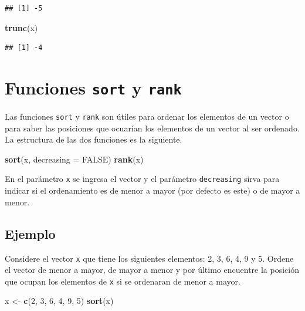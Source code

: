 \documentclass[10pt,]{krantz}
\makeatletter
\newenvironment{Shaded}{\begin{snugshade}}{\end{snugshade}}
\newcommand{\KeywordTok}[1]{\textcolor[rgb]{0.13,0.29,0.53}{\textbf{{#1}}}}
\newcommand{\DataTypeTok}[1]{\textcolor[rgb]{0.13,0.29,0.53}{{#1}}}
\newcommand{\DecValTok}[1]{\textcolor[rgb]{0.00,0.00,0.81}{{#1}}}
\newcommand{\StringTok}[1]{\textcolor[rgb]{0.31,0.60,0.02}{{#1}}}
\newcommand{\OtherTok}[1]{\textcolor[rgb]{0.56,0.35,0.01}{{#1}}}
\newcommand{\NormalTok}[1]{{#1}}
\newenvironment{kframe}{%
\medskip{}
\setlength{\fboxsep}{.8em}
 \def\at@end@of@kframe{}%
 \ifinner\ifhmode%
  \def\at@end@of@kframe{\end{minipage}}%
  \begin{minipage}{\columnwidth}%
 \fi\fi%
 \def\FrameCommand##1{\hskip\@totalleftmargin \hskip-\fboxsep
 \colorbox{shadecolor}{##1}\hskip-\fboxsep
     \hskip-\linewidth \hskip-\@totalleftmargin \hskip\columnwidth}%
 \MakeFramed {\advance\hsize-\width
   \@totalleftmargin\z@ \linewidth\hsize
   \@setminipage}}%
 {\par\unskip\endMakeFramed%
 \at@end@of@kframe}
\renewenvironment{Shaded}{\begin{kframe}}{\end{kframe}}
\makeatother
\begin{document}
\begin{verbatim}
## [1] -5
\end{verbatim}

\begin{Shaded}
\begin{Highlighting}[]
\KeywordTok{trunc}\NormalTok{(x)}
\end{Highlighting}
\end{Shaded}

\begin{verbatim}
## [1] -4
\end{verbatim}

\section{\texorpdfstring{Funciones \texttt{sort} y \texttt{rank}
  
}{Funciones sort y rank    }}\label{funciones-sort-y-rank}

Las funciones \texttt{sort} y \texttt{rank} son útiles para ordenar los
elementos de un vector o para saber las posiciones que ocuarían los
elementos de un vector al ser ordenado. La estructura de las dos
funciones es la siguiente.

\begin{Shaded}
\begin{Highlighting}[]
\KeywordTok{sort}\NormalTok{(x, }\DataTypeTok{decreasing =} \OtherTok{FALSE}\NormalTok{)}
\KeywordTok{rank}\NormalTok{(x)}
\end{Highlighting}
\end{Shaded}

En el parámetro \texttt{x} se ingresa el vector y el parámetro
\texttt{decreasing} sirva para indicar si el ordenamiento es de menor a
mayor (por defecto es este) o de mayor a menor.

\subsection*{Ejemplo}\label{ejemplo-14}


Considere el vector \texttt{x} que tiene los siguientes elementos: 2, 3,
6, 4, 9 y 5. Ordene el vector de menor a mayor, de mayor a menor y por
último encuentre la posición que ocupan los elementos de \texttt{x} si
se ordenaran de menor a mayor.

\begin{Shaded}
\begin{Highlighting}[]
\NormalTok{x <-}\StringTok{ }\KeywordTok{c}\NormalTok{(}\DecValTok{2}\NormalTok{, }\DecValTok{3}\NormalTok{, }\DecValTok{6}\NormalTok{, }\DecValTok{4}\NormalTok{, }\DecValTok{9}\NormalTok{, }\DecValTok{5}\NormalTok{)}
\KeywordTok{sort}\NormalTok{(x)}
\end{Highlighting}
\end{Shaded}
\end{document}

